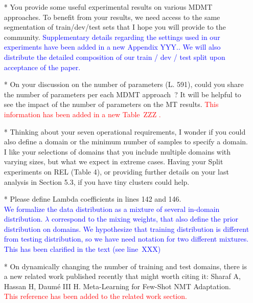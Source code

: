 \documentclass[12pt,times,a4paper,twoside]{article}
\newcommand{\fyTodo}[1]{\Todo[FY:]{\textcolor{orange}{#1}}}
\theoremstyle{definition}
\begin{document}
\begin{itemize}
\item[*] You provide some useful experimental results on various MDMT approaches. To benefit from your results, we need access to the same segmentation of train/dev/test sets that I hope you will provide to the community.
\textcolor{blue}{Supplementary details regarding the settings used in our experiments have been added in a new Appendix YYY.\fyTodo{Fix the appendix.}. We will also distribute the detailed composition of our train / dev / test split upon acceptance of the paper.}
\\
\item[*] On your discussion on the number of parameters (L. 591), could you share the number of parameters per each MDMT approach~? It will be helpful to see  the impact of the number of parameters on the MT results.
  \textcolor{red}{This information has been added in a new Table~ZZZ \fyTodo{Table number, page and line number and content}.}
\\ 
\item[*] Thinking about your seven operational requirements, I wonder if you could also define a domain or the minimum number of samples to specify a domain. I like your selections of domains that you include multiple domains with varying sizes, but what we expect in extreme cases. Having your Split experiments on REL (Table 4), or providing further details on your last analysis in Section 5.3, if you have tiny clusters could help.\fyTodo{Answer this with more experiments ?}
\\
\item[*] Please define Lambda coefficients in lines 142 and 146.
\\
\textcolor{blue}{We formalize the data distribution as a mixture of several in-domain distribution. $\lambda$ correspond to the mixing weights, that also define the prior distribution on domains. We hypothesize that training distribution is different from testing distribution, so we have need notation for two different mixtures. This has been clarified in the text (see line~XXX) \fyTodo{add lines}}
\\
\item[*] On dynamically changing the number of training and test domains, there is a new related work published recently that might worth citing it: Sharaf A, Hassan H, Daumé III H. Meta-Learning for Few-Shot NMT Adaptation.
\\
\textcolor{red}{This reference has been added to the related work section.}\fyTodo{Add citation}

\end{itemize}
\end{document}

